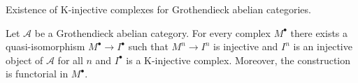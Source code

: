 %
\begin{theorem}
\label{theorem-K-injective-embedding-grothendieck}
\begin{slogan}
Existence of K-injective complexes for Grothendieck abelian categories.
\end{slogan}
Let $\mathcal{A}$ be a Grothendieck abelian category.
For every complex $M^\bullet$ there exists a quasi-isomorphism
$M^\bullet \to I^\bullet$ such that $M^n \to I^n$ is injective and $I^n$
is an injective object of $\mathcal{A}$ for all $n$ and $I^\bullet$
is a K-injective complex. Moreover, the construction is functorial in
$M^\bullet$.
\end{theorem}

